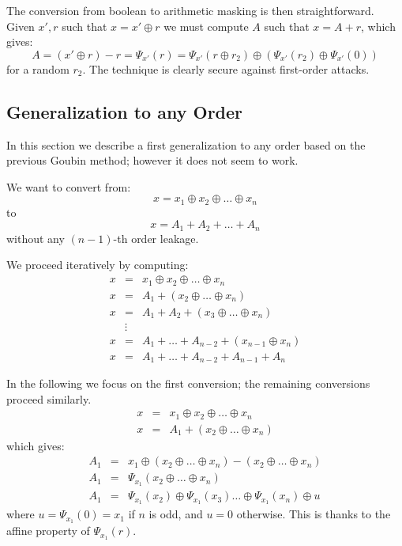 \documentclass[11pt]{llncs}
\begin{document}
The conversion from boolean to arithmetic masking is then
straightforward. Given $x',r$ such that 
$x=x' \oplus r$
we must compute $A$ such that $x=A+r$, which gives:
$$ A=(x' \oplus r)-r=\Psi_{x'}(r)=\Psi_{x'}(r \oplus r_2) \oplus
\left(\Psi_{x'}(r_2) \oplus \Psi_{x'}(0) \right)$$
for a random $r_2$. The technique is clearly secure against
first-order attacks.


\subsection{Generalization to any Order}

\label{s:firstgen}

In this section we describe a first generalization to any order based on the
previous Goubin 
method; however it does not seem to work. 

We want to convert from:
$$ x=x_1 \oplus x_2 \oplus \ldots \oplus x_n$$
to
$$x =A_1 + A_2 + \ldots + A_n$$
without any $(n-1)$-th order leakage.

We proceed iteratively by computing:
\begin{eqnarray*}
x& =& x_1 \oplus x_2 \oplus \ldots \oplus x_n \\
x & = & A_1 + (x_2 \oplus \ldots \oplus x_n) \\
x & = & A_1 + A_2 + (x_3 \oplus \ldots \oplus x_n) \\
& \vdots & \\
x & = & A_1 + \ldots + A_{n-2} + (x_{n-1} \oplus x_n) \\
x & = & A_1 + \ldots + A_{n-2}+ A_{n-1} + A_n
\end{eqnarray*}

In the following we focus on the first conversion; the remaining
conversions proceed similarly.
\begin{eqnarray*}
x& =& x_1 \oplus x_2 \oplus \ldots \oplus x_n \\
x & = & A_1 + (x_2 \oplus \ldots \oplus x_n) 
\end{eqnarray*}
which gives:
\begin{eqnarray*}
A_1 & = & x_1 \oplus (x_2 \oplus \ldots \oplus x_n) - (x_2 \oplus \ldots
\oplus x_n) \\
A_1 & = & \Psi_{x_1}(x_2 \oplus \ldots \oplus x_n) \\
A_1 & = & \Psi_{x_1}(x_2) \oplus \Psi_{x_1}(x_3) \ldots \oplus
\Psi_{x_1}(x_n) \oplus u
\end{eqnarray*}
where $u=\Psi_{x_1}(0)=x_1$ if $n$ is odd, and $u=0$ otherwise. This
is thanks to the affine property of $\Psi_{x_1}(r)$.
\end{document}
